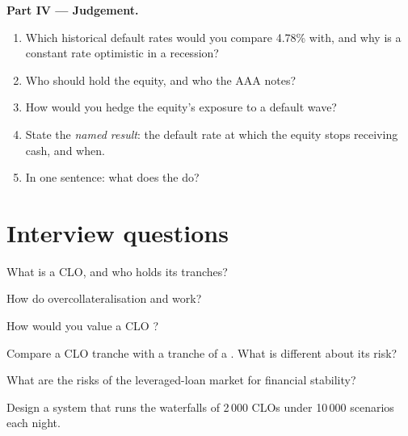 \begin{problem}
\medskip\noindent\textbf{Part IV --- Judgement.}
\begin{enumerate}[resume]
\item Which historical default rates would you compare 4.78\% with, and why is a
constant rate optimistic in a recession?
\item Who should hold the equity, and who the AAA notes?
\item How would you hedge the equity's exposure to a default wave?
\item State the \emph{named result}: the default rate at which the equity stops
receiving cash, and when.
\item In one sentence: what does the  do?
\end{enumerate}
\end{problem}

\section{Interview questions}

\begin{interviewq}\label{iq:m2:loans-clos-and-securitisation:1}
What is a CLO, and who holds its tranches?
\end{interviewq}

\begin{interviewq}\label{iq:m2:loans-clos-and-securitisation:2}
How do overcollateralisation and  work?
\end{interviewq}

\begin{interviewq}\label{iq:m2:loans-clos-and-securitisation:3}
How would you value a CLO ?
\end{interviewq}

\begin{interviewq}\label{iq:m2:loans-clos-and-securitisation:4}
Compare a CLO tranche with a tranche of a . What is different about its
risk?
\end{interviewq}

\begin{interviewq}\label{iq:m2:loans-clos-and-securitisation:5}
What are the risks of the leveraged-loan market for financial stability?
\end{interviewq}

\begin{interviewq}\label{iq:m2:loans-clos-and-securitisation:6}
Design a system that runs the waterfalls of 2\,000 CLOs under 10\,000 scenarios each
night.
\end{interviewq}
